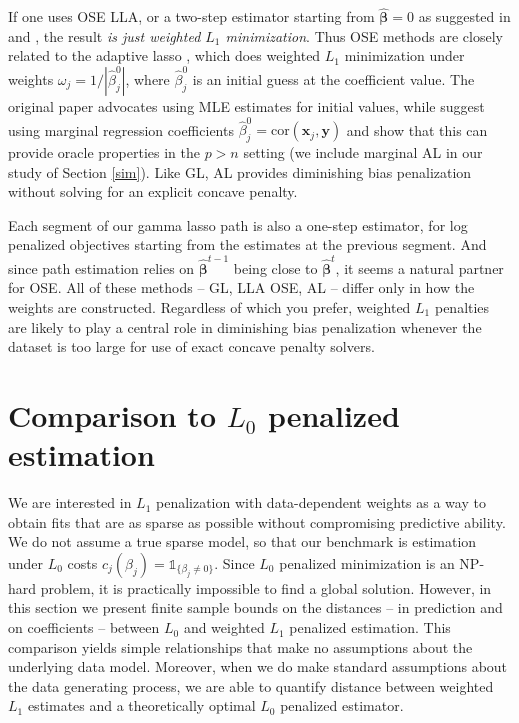 \documentclass[12pt]{article}
\newcommand{\bs}[1]{\boldsymbol{#1}}
\newcommand{\mr}[1]{\mathrm{#1}}
\newcommand{\bm}[1]{\mathbf{#1}}
\newcommand{\ds}[1]{\mathds{#1}}
\begin{document}
If one uses OSE LLA, or a two-step estimator starting from
$\bs{\hat\beta}=0$ as suggested in \cite{fan_strong_2014} and
\cite{wang_calibrating_2013}, the result {\it is just weighted $L_1$
minimization}. Thus OSE methods are  closely related to  the adaptive lasso
\citep[AL;][]{zou_adaptive_2006}, which does weighted $L_1$ minimization under
weights $\omega_j = 1/|\hat\beta^0_j|$, where $\hat\beta^0_j$ is an initial
guess at the coefficient value.  The original paper advocates using MLE
estimates for initial values, while
\cite{huang_adaptive_2008} suggest using marginal regression coefficients
$\hat\beta^0_j = \mr{cor}(\bm{x}_j,\bm{y})$ and show that this can provide oracle
properties in the  $p>n$ setting (we include marginal AL in our study of
Section \ref{sim}).  Like GL, AL provides
diminishing bias penalization without solving for an explicit concave penalty.

Each segment of our gamma lasso path is also a one-step estimator, for log
penalized objectives starting from the estimates at the previous segment.  And
since path estimation relies on $\bs{\hat\beta}^{t-1}$ being close to
$\bs{\hat\beta}^{t}$, it seems a natural partner for OSE. All of these methods
-- GL, LLA OSE, AL -- differ only in how the weights are
constructed.  Regardless of which you prefer, weighted $L_1$ penalties are
likely to play a central role in diminishing bias penalization whenever the
dataset is too large for use of exact concave penalty solvers.

\section{Comparison to $L_0$ penalized estimation}
\label{theory}

We are interested in $L_1$ penalization with data-dependent weights as a way
to obtain fits that are as sparse as possible without compromising predictive
ability.  We do not assume a true sparse model, so that our
benchmark is estimation under $L_0$ costs $c_j(\beta_j) = \ds{1}_{\{\beta_j\neq0\}}$.   Since $L_0$ penalized minimization
is an NP-hard problem, it is practically impossible to find a
global solution.  However, in this section we present finite sample bounds on
the distances -- in prediction and on coefficients -- between  $L_0$  and weighted
$L_1$ penalized estimation.  This comparison yields simple
relationships that make no assumptions about the underlying data model.
Moreover, when we do make standard assumptions about the data generating
process, we are able to quantify distance between weighted $L_1$ estimates and
a theoretically optimal $L_0$ penalized estimator.
\end{document}
